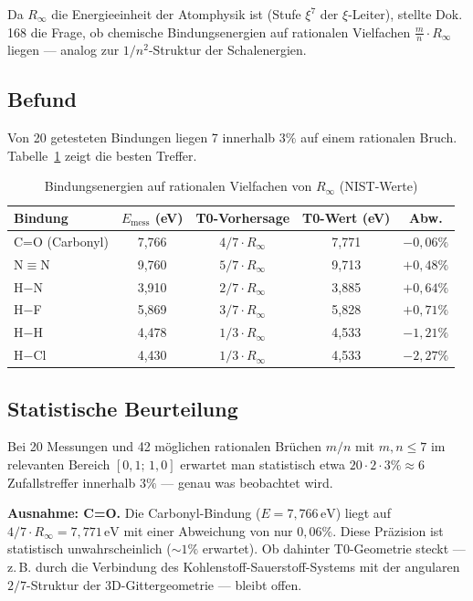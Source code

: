 Da $R_\infty$ die Energieeinheit der Atomphysik ist (Stufe $\xi^7$ der
$\xi$-Leiter), stellte Dok.\,168 die Frage, ob chemische Bindungsenergien
auf rationalen Vielfachen $\frac{m}{n} \cdot R_\infty$ liegen — analog zur
$1/n^2$-Struktur der Schalenergien.

\subsection{Befund}
\label{subsec:befund-be}

Von 20 getesteten Bindungen liegen 7 innerhalb $3\%$ auf einem rationalen Bruch.
Tabelle~\ref{tab:bindungen} zeigt die besten Treffer.

\begin{table}[htbp]
\centering
\caption{Bindungsenergien auf rationalen Vielfachen von $R_\infty$ (NIST-Werte)}
\label{tab:bindungen}
\begin{tabular}{lcccc}
\hline
Bindung & $E_\mathrm{mess}$ (eV) & T0-Vorhersage & T0-Wert (eV) & Abw. \\
\hline
C=O (Carbonyl) & 7{,}766 & $4/7 \cdot R_\infty$ & 7{,}771 & $-0{,}06\%$ \\
N$\equiv$N     & 9{,}760 & $5/7 \cdot R_\infty$ & 9{,}713 & $+0{,}48\%$ \\
H$-$N          & 3{,}910 & $2/7 \cdot R_\infty$ & 3{,}885 & $+0{,}64\%$ \\
H$-$F          & 5{,}869 & $3/7 \cdot R_\infty$ & 5{,}828 & $+0{,}71\%$ \\
H$-$H          & 4{,}478 & $1/3 \cdot R_\infty$ & 4{,}533 & $-1{,}21\%$ \\
H$-$Cl         & 4{,}430 & $1/3 \cdot R_\infty$ & 4{,}533 & $-2{,}27\%$ \\
\hline
\end{tabular}
\end{table}

\subsection{Statistische Beurteilung}
\label{subsec:statistik-be}

Bei 20 Messungen und 42 möglichen rationalen Brüchen $m/n$ mit $m,n \leq 7$
im relevanten Bereich $[0{,}1;\, 1{,}0]$ erwartet man statistisch etwa
$20 \cdot 2 \cdot 3\% \approx 6$ Zufallstreffer innerhalb $3\%$
— genau was beobachtet wird.

\textbf{Ausnahme: C=O.}
Die Carbonyl-Bindung ($E = 7{,}766\,\mathrm{eV}$) liegt auf
$4/7 \cdot R_\infty = 7{,}771\,\mathrm{eV}$ mit einer Abweichung von
nur $0{,}06\%$. Diese Präzision ist statistisch unwahrscheinlich ($\sim1\%$
erwartet). Ob dahinter T0-Geometrie steckt — z.\,B. durch die Verbindung
des Kohlenstoff-Sauerstoff-Systems mit der angularen $2/7$-Struktur
der 3D-Gittergeometrie — bleibt offen.

